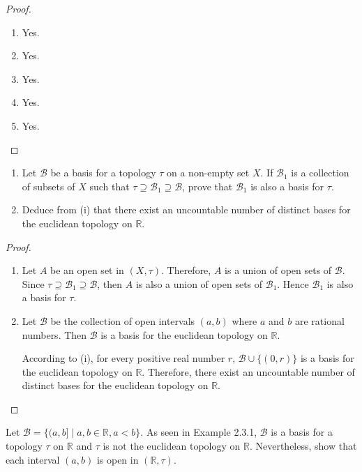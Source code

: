 \begin{proof}
	\begin{enumerate}[label={(\roman*)}]
		\item Yes.
		\item Yes.
		\item Yes.
		\item Yes.
		\item Yes.
	\end{enumerate}
\end{proof}
\newpage

\begin{exercise}
	\begin{enumerate}[label={(\roman*)}]
		\item Let $\mathcal{B}$ be a basis for a topology $\tau$ on a non-empty set $X$. If $\mathcal{B}_{1}$ is a collection of subsets of $X$ such that $\tau\supseteq \mathcal{B}_{1} \supseteq \mathcal{B}$, prove that $\mathcal{B}_{1}$ is also a basis for $\tau$.
		\item Deduce from (i) that there exist an uncountable number of distinct bases for the euclidean topology on $\mathbb{R}$.
	\end{enumerate}
\end{exercise}

\begin{proof}
	\begin{enumerate}[label={(\roman*)}]
		\item Let $A$ be an open set in $(X, \tau)$. Therefore, $A$ is a union of open sets of $\mathcal{B}$. Since $\tau \supseteq \mathcal{B}_{1} \supseteq \mathcal{B}$, then $A$ is also a union of open sets of $\mathcal{B}_{1}$. Hence $\mathcal{B}_{1}$ is also a basis for $\tau$.
		\item Let $\mathcal{B}$ be the collection of open intervals $(a, b)$ where $a$ and $b$ are rational numbers. Then $\mathcal{B}$ is a basis for the euclidean topology on $\mathbb{R}$.

		      According to (i), for every positive real number $r$, $\mathcal{B} \cup \{ (0, r) \}$ is a basis for the euclidean topology on $\mathbb{R}$. Therefore, there exist an uncountable number of distinct bases for the euclidean topology on $\mathbb{R}$.
	\end{enumerate}
\end{proof}
\newpage

\begin{exercise}
	Let $\mathcal{B} = \{ (a, b] \mid a, b\in\mathbb{R}, a < b \}$. As seen in Example 2.3.1, $\mathcal{B}$ is a basis for a topology $\tau$ on $\mathbb{R}$ and $\tau$ is $\boxed{\text{not}}$ the euclidean topology on $\mathbb{R}$. Nevertheless, show that each interval $(a, b)$ is open in $(\mathbb{R}, \tau)$.
\end{exercise}

